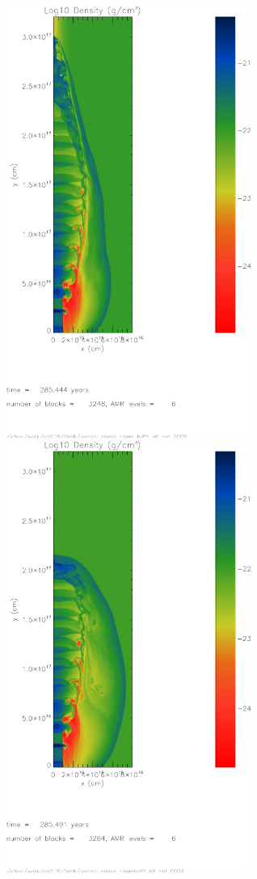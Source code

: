 \begin{figure}[t]
\begin{center}
   \begin{minipage}[t]{.48\linewidth}
\includegraphics[width=8cm]{flash_evac_cav1}
   \end{minipage} 
   \begin{minipage}[t]{.48\linewidth}
\includegraphics[width=8cm]{flash_evac_cav2}

\end{minipage}
\end{center}
\end{figure}
